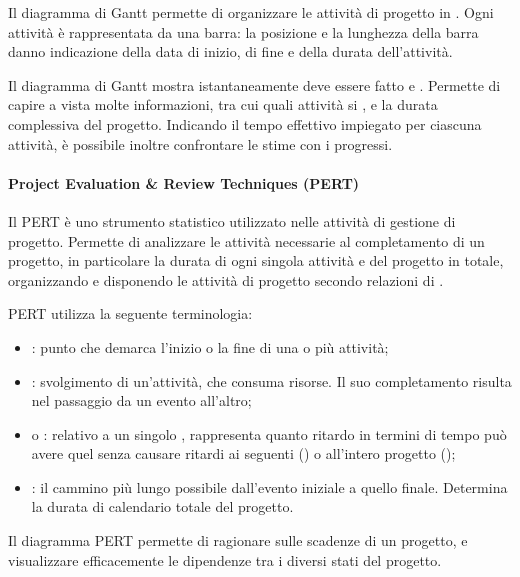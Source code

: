 Il diagramma di Gantt permette di organizzare le attività di progetto in
. Ogni attività è rappresentata da una barra: la
posizione e la lunghezza della barra danno indicazione della data di inizio, di
fine e della durata dell'attività.


Il diagramma di Gantt mostra istantaneamente  deve essere fatto e
. Permette di capire a vista molte informazioni, tra cui quali
attività si , e la durata complessiva del progetto.
Indicando il tempo effettivo impiegato per ciascuna attività, è possibile
inoltre confrontare le stime con i progressi.

\paragraph{Project Evaluation \& Review Techniques (PERT)}

Il PERT è uno strumento statistico utilizzato nelle attività di gestione di
progetto. Permette di analizzare le attività necessarie al completamento di un
progetto, in particolare la durata di ogni singola attività e del progetto in
totale, organizzando e disponendo le attività di progetto secondo relazioni di
.

PERT utilizza la seguente terminologia:

\begin{itemize}
  \item {}: punto che demarca l'inizio o la fine di una o più
    attività;
  \item {}: svolgimento di un'attività, che consuma risorse.
    Il suo completamento risulta nel passaggio da un evento all'altro;
  \item {} o : relativo a un
    singolo , rappresenta quanto ritardo in termini di tempo può
    avere quel  senza causare ritardi ai  seguenti
    () o all'intero progetto ();
  \item {}: il cammino più lungo possibile dall'evento
    iniziale a quello finale. Determina la durata di calendario totale del
    progetto.
\end{itemize}

Il diagramma PERT permette di ragionare sulle scadenze di un progetto, e
visualizzare efficacemente le dipendenze tra i diversi stati del progetto.

